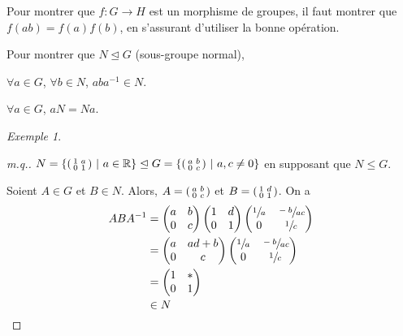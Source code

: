 \documentclass{report}
\newcommand*{\lte}{\leqslant}
\newcommand*{\reels}{\mathbb{R}}
\theoremstyle{definition}
\theoremstyle{remark}
\newtheorem*{exem}{Exemple}
\begin{document}
	Pour montrer que $f:G \to H$ est un morphisme de groupes, il faut montrer que $f(ab)=f(a)f(b)$, en s'assurant d'utiliser la bonne op\'eration.

	Pour montrer que $N \trianglelefteq G$ (sous-groupe normal),
	\begin{nlist}
		\item $\forall a \in G$, $\forall b \in N$, $aba^{-1} \in N$.
		\item $\forall a \in G$, $aN=Na$.
	\end{nlist}
	\begin{exem}~

		\begin{proof}[m.q.]
			$N = \left\{ \begin{psmallmatrix}
				1&a\\0&1
			\end{psmallmatrix} ~\middle|~ a \in \reels \right\} \trianglelefteq G = \left\{ \begin{psmallmatrix}
				a&b\\0&c
			\end{psmallmatrix} ~\middle|~ a,c \neq 0 \right\}$ en supposant que $N \lte G$.

			Soient $A \in G$ et $B \in N$. Alors, $A = \begin{psmallmatrix}
				a&b\\0&c
			\end{psmallmatrix}$ et $B = \begin{psmallmatrix}
				1&d\\0&1
			\end{psmallmatrix}$. On a
			\begin{align*}
				ABA^{-1}&= \begin{pmatrix}
					a&b\\0&c
				\end{pmatrix} \begin{pmatrix}
					1&d\\0&1
				\end{pmatrix} \begin{pmatrix}
					\sfrac{1}{a}&\sfrac{-b}{ac}\\0&\sfrac{1}{c}
				\end{pmatrix}\\
				&= \begin{pmatrix}
					a&ad+b\\0&c
				\end{pmatrix} \begin{pmatrix}
					\sfrac{1}{a}&\sfrac{-b}{ac}\\0&\sfrac{1}{c}
				\end{pmatrix}\\
				&= \begin{pmatrix}
					1&*\\0&1
				\end{pmatrix}\\
				&\in N
			\end{align*}
		\end{proof}
	\end{exem}
\end{document}

